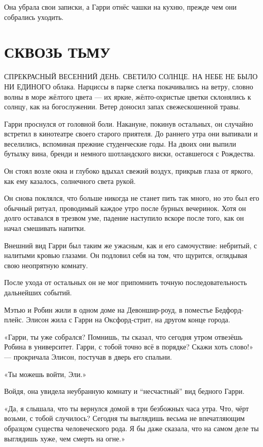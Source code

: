 \documentclass[a5paper, 9pt,
final, openany, twoside=true]{memoir}
\begin{document}
Она убрала свои записки, а Гарри отнёс чашки на кухню, прежде чем они собрались уходить.
\chapter{СКВОЗЬ ТЬМУ}
С{ ПРЕКРАСНЫЙ ВЕСЕННИЙ ДЕНЬ. СВЕТИЛО СОЛНЦЕ. НА НЕБЕ НЕ БЫЛО НИ ЕДИНОГО} облака. Нарциссы в парке слегка покачивались на ветру, словно волны в море жёлтого цвета — их яркие, жёлто-охристые цветки склонялись к солнцу, как на богослужении. Ветер доносил запах свежескошенной травы.\bigskip

Гарри проснулся от головной боли. Накануне, покинув остальных, он случайно встретил в кинотеатре своего старого приятеля. До раннего утра они выпивали и веселились, вспоминая прежние студенческие годы. На двоих они выпили бутылку вина, бренди и немного шотландского виски, оставшегося с Рождества.

Он стоял возле окна и глубоко вдыхал свежий воздух, прикрыв глаза от яркого, как ему казалось, солнечного света рукой.

Он снова поклялся, что больше никогда не станет пить так много, но это был его обычный ритуал, проводимый каждое утро после бурных вечеринок. Хотя он долго оставался в трезвом уме, падение наступило вскоре после того, как он начал смешивать напитки.

Внешний вид Гарри был таким же ужасным, как и его самочуствие: небритый, с налитыми кровью глазами. Он подловил себя на том, что щурится, оглядывая свою неопрятную комнату.

После ухода от остальных он не мог припомнить точную последовательность дальнейших событий.

Мэтью и Робин жили в одном доме на Девоншир-роуд, в поместье Бедфорд-плейс. Элисон жила с Гарри на Оксфорд-стрит, на другом конце города.\bigskip

«Гарри, ты уже собрался? Помнишь, ты сказал, что сегодня утром отвезёшь Робина в университет. Гарри, с тобой точно всё в порядке? Скажи хоть слово!» — прокричала Элисон, постучав в дверь его спальни.

«Ты можешь войти, Эли.»

Войдя, она увидела неубранную комнату и ``несчастный'' вид бедного Гарри.

«Да, я слышала, что ты вернулся домой в три безбожных часа утра. Что, чёрт возьми, с тобой случилось? Сегодня ты выглядишь весьма не впечатляющим образцом существа человеческого рода. Я бы даже сказала, что на самом деле ты выглядишь хуже, чем смерть на огне.»
\end{document}
